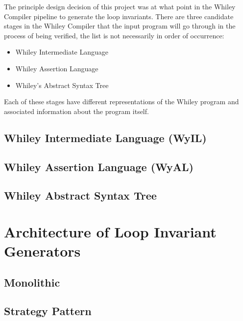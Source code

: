 The principle design decision of this project was at
what point in the Whiley Compiler pipeline
to generate the loop invariants.
There are three candidate stages in the Whiley Compiler
that the input program will go through in the process of
being verified, the list is not necessarily in order of occurrence:

\begin{itemize}
    \item{Whiley Intermediate Language}
    \item{Whiley Assertion Language}
    \item{Whiley's Abstract Syntax Tree}
\end{itemize}

Each of these stages have different representations of the Whiley program and
associated information about the program itself.

\subsection{Whiley Intermediate Language (WyIL)}

\cite{wyil}

\subsection{Whiley Assertion Language (WyAL)}

\subsection{Whiley Abstract Syntax Tree}

\section{Architecture of Loop Invariant Generators}

\subsection{Monolithic}

\subsection{Strategy Pattern}
